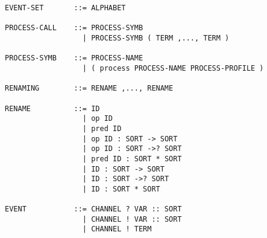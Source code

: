 \begin{verbatim}
EVENT-SET       ::= ALPHABET

PROCESS-CALL    ::= PROCESS-SYMB
                  | PROCESS-SYMB ( TERM ,..., TERM )

PROCESS-SYMB    ::= PROCESS-NAME
                  | ( process PROCESS-NAME PROCESS-PROFILE )

RENAMING        ::= RENAME ,..., RENAME

RENAME          ::= ID
                  | op ID
                  | pred ID
                  | op ID : SORT -> SORT
                  | op ID : SORT ->? SORT
                  | pred ID : SORT * SORT
                  | ID : SORT -> SORT
                  | ID : SORT ->? SORT
                  | ID : SORT * SORT

EVENT           ::= CHANNEL ? VAR :: SORT
                  | CHANNEL ! VAR :: SORT
                  | CHANNEL ! TERM
\end{verbatim}
